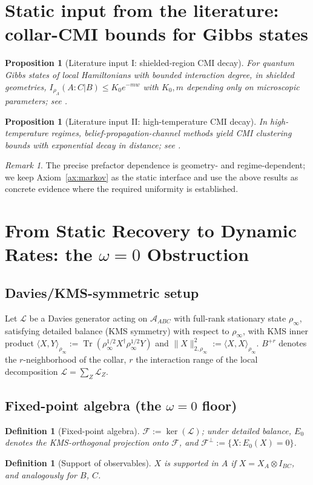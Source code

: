 \documentclass[11pt]{article}
\newtheorem{proposition}[theorem]{Proposition}
\newtheorem{definition}[theorem]{Definition}
\theoremstyle{remark}
\newtheorem{remark}[theorem]{Remark}
\newcommand{\Tr}{\operatorname{Tr}}
\begin{document}
\section{Static input from the literature: collar-CMI bounds for Gibbs
states}
\begin{proposition}[Literature input I: shielded-region CMI decay]
For quantum Gibbs states of local Hamiltonians with bounded interaction
degree, in shielded geometries, $I_{\rho_\Lambda}(A:C|B) \le K_0 e^{-mw}$
with $K_0, m$ depending only on microscopic parameters; see \cite{CR}.
\end{proposition}
\begin{proposition}[Literature input II: high-temperature CMI decay]
In high-temperature regimes, belief-propagation-channel methods yield CMI
clustering bounds with exponential decay in distance; see \cite{KK}.
\end{proposition}
\begin{remark}
The precise prefactor dependence is geometry- and regime-dependent; we keep
Axiom~\ref{ax:markov} as the static interface and use the above results as
concrete evidence where the required uniformity is established.
\end{remark}

\section{From Static Recovery to Dynamic Rates: the $\omega=0$ Obstruction}

\subsection{Davies/KMS-symmetric setup}
Let $\mathcal{L}$ be a Davies generator acting on $\mathcal{A}_{ABC}$ with
full-rank stationary state $\rho_\infty$, satisfying detailed balance (KMS
symmetry) with respect to $\rho_\infty$, with KMS inner product
$\langle X, Y\rangle_{\rho_\infty} := \Tr(\rho_\infty^{1/2} X^\dagger
\rho_\infty^{1/2} Y)$ and $\|X\|^2_{2,\rho_\infty} := \langle X, X
\rangle_{\rho_\infty}$. $B^{+r}$ denotes the $r$-neighborhood of the
collar, $r$ the interaction range of the local decomposition
$\mathcal{L} = \sum_Z \mathcal{L}_Z$.

\subsection{Fixed-point algebra (the $\omega=0$ floor)}
\begin{definition}[Fixed-point algebra]
$\mathcal{F} := \ker(\mathcal{L})$; under detailed balance, $E_0$ denotes
the KMS-orthogonal projection onto $\mathcal{F}$, and
$\mathcal{F}^\perp := \{X : E_0(X) = 0\}$.
\end{definition}
\begin{definition}[Support of observables]
$X$ is supported in $A$ if $X = X_A \otimes I_{BC}$, and analogously for
$B$, $C$.
\end{definition}
\end{document}
